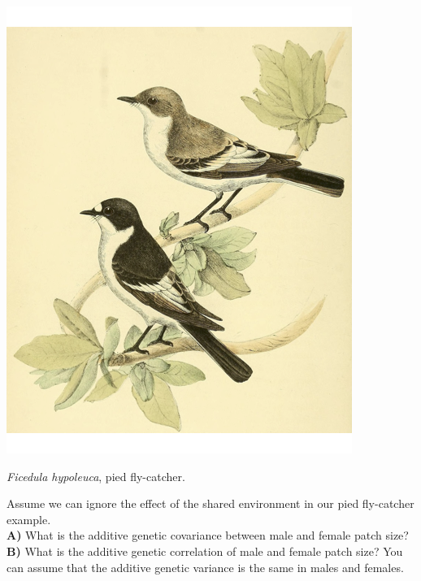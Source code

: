 \begin{marginfigure}
\begin{center}
\includegraphics[width=0.9
\textwidth]{illustration_images/Quant_gen/pied_fly_catcher/pied_fly_catcher.png}
\end{center}
\caption{{\it Ficedula hypoleuca}, pied fly-catcher.  } \label{fig:FlyCatcher}   %
\end{marginfigure}

\begin{question}{}
Assume we can ignore the effect of the shared environment in our pied fly-catcher example. \\
{\bf A)} What is the additive genetic covariance between male and female patch size?\\
{\bf B)} What is the additive genetic correlation of male and female patch size? You can assume that the additive genetic variance is the same in males and females.
\end{question}

